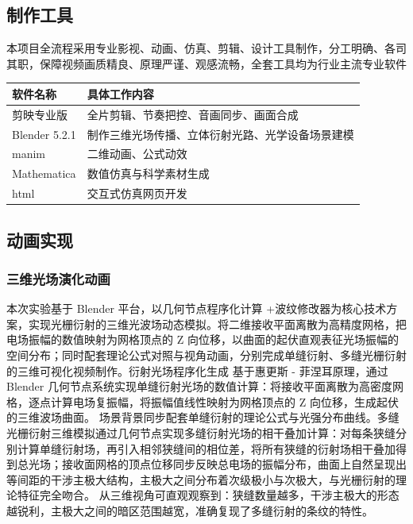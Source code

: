 \documentclass[12pt,a4paper]{ctexrep}
\begin{document}
\subsection{制作工具}

本项目全流程采用专业影视、动画、仿真、剪辑、设计工具制作，分工明确、各司其职，保障视频画质精良、原理严谨、观感流畅，全套工具均为行业主流专业软件

\begin{table}[htbp]
\centering
\begin{tabular}{ll}
\toprule
软件名称 & 具体工作内容 \\
\midrule
剪映专业版 & 全片剪辑、节奏把控、音画同步、画面合成 \\
Blender 5.2.1 & 制作三维光场传播、立体衍射光路、光学设备场景建模 \\
manim & 二维动画、公式动效 \\
Mathematica & 数值仿真与科学素材生成 \\
html & 交互式仿真网页开发 \\
\bottomrule
\end{tabular}
\end{table}

\subsection{动画实现}

\subsubsection{三维光场演化动画}

本次实验基于 Blender 平台，以几何节点程序化计算 +波纹修改器为核心技术方案，实现光栅衍射的三维光波场动态模拟。将二维接收平面离散为高精度网格，把电场振幅的数值映射为网格顶点的 Z 向位移，以曲面的起伏直观表征光场振幅的空间分布；同时配套理论公式对照与视角动画，分别完成单缝衍射、多缝光栅衍射的三维可视化视频制作。衍射光场程序化生成 基于惠更斯 - 菲涅耳原理，通过 Blender 几何节点系统实现单缝衍射光场的数值计算：将接收平面离散为高密度网格，逐点计算电场复振幅，将振幅值线性映射为网格顶点的 Z 向位移，生成起伏的三维波场曲面。 场景背景同步配套单缝衍射的理论公式与光强分布曲线。多缝光栅衍射三维模拟通过几何节点实现多缝衍射光场的相干叠加计算：对每条狭缝分别计算单缝衍射场，再引入相邻狭缝间的相位差，将所有狭缝的衍射场相干叠加得到总光场；接收面网格的顶点位移同步反映总电场的振幅分布，曲面上自然呈现出等间距的干涉主极大结构，主极大之间分布着次级极小与次极大，与光栅衍射的理论特征完全吻合。 从三维视角可直观观察到：狭缝数量越多，干涉主极大的形态越锐利，主极大之间的暗区范围越宽，准确复现了多缝衍射的条纹的特性。
\end{document}
